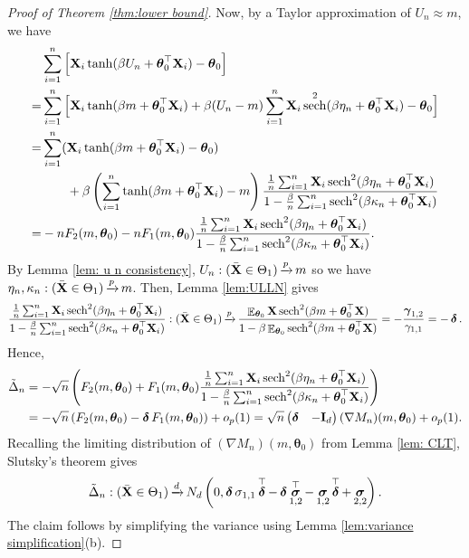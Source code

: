 \documentclass[preprint,reqno]{imsart}
\newcommand{\ttheta}{\boldsymbol{\theta}}
\newcommand{\I}{\mathbf{I}_{\mathnormal{d}}}
\DeclareMathOperator{\xp}{\xrightarrow{\mathnormal p}}
\DeclareMathOperator{\xd}{\xrightarrow{\mathnormal d}}
\DeclareMathOperator{\ggamma}{\boldsymbol{\gamma}}
\DeclareMathOperator{\ssigma}{\boldsymbol{\sigma}}
\DeclareMathOperator{\ddelta}{\boldsymbol{\delta}}
\DeclareMathOperator{\sech}{sech}
\DeclareMathOperator{\EE}{\mathbb{E}}
\newcommand{\X}{\mathbf{X}}
\DeclareMathOperator{\sumin}{\sum_{\mathnormal i=1}^{\mathnormal n}}
\begin{document}
\begin{appendix}
\begin{proof}[Proof of Theorem \ref{thm:lower bound}]
Now, by a Taylor approximation of $U_n \approx m$, we have
%
%
%
%
%
%
\begin{align*}
    & \sumin \Big[\X_i \tanh(\beta U_n + \ttheta_0^\top \X_i) - \ttheta_0\Big] \\ 
    = & \sumin \Big[\X_i \tanh(\beta m + \ttheta_0^\top \X_i) + \beta (U_n-m) \sumin \X_i \sech^2(\beta \eta_n + \ttheta_0^\top \X_i) - \ttheta_0\Big] \\
    = & \sumin (\X_i \tanh(\beta m + \ttheta_0^\top \X_i) - \ttheta_0) \\
    &\quad \quad + \beta \left(\sumin \tanh(\beta m + \ttheta_0^\top \X_i) - m \right) \frac{\frac{1}{n} \sumin \X_i \sech^2(\beta \eta_n + \ttheta_0^\top \X_i) }{1 - \frac{\beta}{n} \sumin \sech^2(\beta \kappa_n + \ttheta_0^\top \X_i)} \\
    = & - n F_2(m, \ttheta_0) - n F_1(m, \ttheta_0) \frac{\frac{1}{n} \sumin \X_i \sech^2(\beta \eta_n + \ttheta_0^\top \X_i) }{1 - \frac{\beta}{n} \sumin \sech^2(\beta \kappa_n + \ttheta_0^\top \X_i)}.
\end{align*}
By Lemma \ref{lem: u n consistency}, $U_n : (\bar{\X} \in \Theta_1) \xp m$ so we have $\eta_n, \kappa_n : (\bar{\X}\in \Theta_1) \xp m$. Then, Lemma \ref{lem:ULLN} gives 
$$\frac{\frac{1}{n} \sumin \X_i \sech^2(\beta \eta_n + \ttheta_0^\top \X_i) }{1 - \frac{\beta}{n} \sumin \sech^2(\beta \kappa_n + \ttheta_0^\top \X_i)} : (\bar{\X} \in \Theta_1) \xp \frac{\EE_{\ttheta_0} \X \sech^2(\beta m + \ttheta_0^\top \X)}{1 - \beta \EE_{\ttheta_0} \sech^2(\beta m + \ttheta_0^\top \X)} = - \frac{\ggamma_{1,2}}{\gamma_{1,1}} = -\ddelta.$$
Hence,
\begin{align}
    \tilde{\Delta}_n &= - \sqrt{n} \left(F_2(m, \ttheta_0) + F_1(m, \ttheta_0) \frac{\frac{1}{n} \sumin \X_i \sech^2(\beta \eta_n + \ttheta_0^\top \X_i) }{1 - \frac{\beta}{n} \sumin \sech^2(\beta \kappa_n + \ttheta_0^\top \X_i)} \right) \notag \\
    &= - \sqrt{n} \left(F_2(m, \ttheta_0) - \ddelta F_1(m, \ttheta_0) \right) + o_p(1) = \sqrt{n} \begin{pmatrix}
        \ddelta & -\I
    \end{pmatrix}(\nabla M_n)(m,\ttheta_0) + o_p(1). \label{eq:Delta expansion}
\end{align}
Recalling the limiting distribution of $(\nabla M_n)(m,\ttheta_0)$ from Lemma \ref{lem: CLT}, Slutsky's theorem gives
$$\tilde{\Delta}_n : (\bar{\X} \in \Theta_1) \xd N_d \left(0, \ddelta \sigma_{1,1} \ddelta^\top - \ddelta \ssigma_{1,2}^\top - \ssigma_{1,2} \ddelta^\top + \ssigma_{2,2} \right).$$
The claim follows by simplifying the variance using Lemma \ref{lem:variance simplification}(b).


\end{proof}
\end{appendix}
\end{document}
